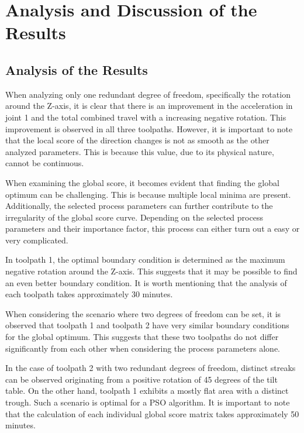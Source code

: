 \newpage
\section{Analysis and Discussion of the Results}%

\subsection{Analysis of the Results}
When analyzing only one redundant degree of freedom, specifically the rotation around the Z-axis, it is clear that there is an improvement in the acceleration in joint 1 and the total combined travel with a increasing negative rotation. This improvement is observed in all three toolpaths. However, it is important to note that the local score of the direction changes is not as smooth as the other analyzed parameters. This is because this value, due to its physical nature, cannot be continuous.

When examining the global score, it becomes evident that finding the global optimum can be challenging. This is because multiple local minima are present. Additionally, the selected process parameters can further contribute to the irregularity of the global score curve.
Depending on the selected process parameters and their importance factor, this process can either turn out a easy or very complicated.

In toolpath 1, the optimal boundary condition is determined as the maximum negative rotation around the Z-axis. This suggests that it may be possible to find an even better boundary condition.
It is worth mentioning that the analysis of each toolpath takes approximately 30 minutes.


When considering the scenario where two degrees of freedom can be set, it is observed that toolpath 1 and toolpath 2 have very similar boundary conditions for the global optimum. This suggests that these two toolpaths do not differ significantly from each other when considering the process parameters alone.

In the case of toolpath 2 with two redundant degrees of freedom, distinct streaks can be observed originating from a positive rotation of 45 degrees of the tilt table.
On the other hand, toolpath 1 exhibits a mostly flat area with a distinct trough. Such a scenario is optimal for a PSO algorithm.
It is important to note that the calculation of each individual global score matrix takes approximately 50 minutes. 



